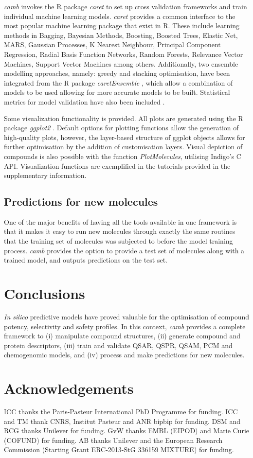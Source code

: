 \documentclass{bioinfo}
\begin{document}
{\it camb} invokes the R package {\it caret} to set up cross validation frameworks and
train individual machine learning models. {\it caret} provides a common interface to the most popular machine learning package that exist in R.
These include learning methods in Bagging, Bayesian Methods, Boosting, Boosted Trees, Elastic Net, MARS, Gaussian Processes, K Nearest Neighbour,
 Principal Component Regression, Radial Basis Function Networks, Random Forests, Relevance Vector Machines, Support Vector Machines among others.
Additionally, two ensemble modelling approaches, namely: greedy and stacking optimisation,
have been integrated from the R package {\it caretEnsemble} \citep{caretEnsemble}, which allow a combination of models to be used 
allowing for more accurate models to be built.
Statistical metrics for model validation have also been included \citep{beware}.

Some visualization functionality is provided. All plots are generated using the R package {\it ggplot2} \citep{ggplot2}.
Default options for plotting functions allow the generation of high-quality plots,
however, the layer-based structure of ggplot objects allows for further optimisation
by the addition of customisation layers.  
Visual depiction of compounds is also possible with the function {\it PlotMolecules},
utilising Indigo's C API. Visualization functions are exemplified in the tutorials provided in the supplementary information.

\subsection{Predictions for new molecules}
One of the major benefits of having all the tools available in one framework is that it makes it easy to run new molecules through exactly the same routines that the training set of molecules was subjected to before the model training process. {\it camb} provides the option to provide a test set of molecules along with a trained model, and outputs predictions on the test set.

\section{Conclusions}
{\it In silico} predictive models have proved valuable
for the optimisation of compound potency, selectivity and safety profiles.
In this context, {\it camb} provides a complete framework
to (i) manipulate compound structures, (ii) generate compound and protein descriptors,
(iii) train and validate 
QSAR, QSPR, QSAM, PCM and chemogenomic models, and
(iv) process and make predictions for new molecules.

\section{Acknowledgements}
ICC thanks the Paris-Pasteur International PhD Programme for funding.
ICC and TM thank CNRS, Institut Pasteur and ANR bipbip for funding.
DSM and RCG thanks Unilever for funding.
GvW thanks EMBL (EIPOD) and Marie Curie (COFUND) for funding.
AB thanks Unilever and the European Research Commission (Starting Grant ERC-2013-StG 336159 MIXTURE) for funding.



\end{document}
